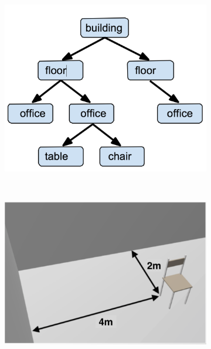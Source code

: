 \documentclass[]{egpubl}
\begin{document}
\begin{figure}[!h]
  \centering
  \begin{subfigure}[b]{0.315\linewidth}
  \includegraphics[width=\textwidth]{images/five1}
  \caption{}
  \end{subfigure}
 ~
  \begin{subfigure}[b]{0.365\linewidth}
  \includegraphics[width=\textwidth]{images/five2} 
  \caption{}
  \end{subfigure}
  ~
  \begin{subfigure}[b]{0.255\linewidth}

\end{subfigure}
\end{figure}
\end{document}
